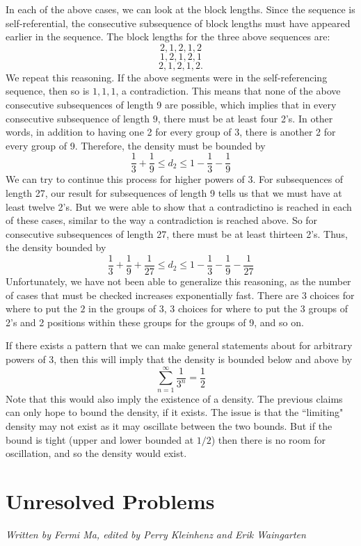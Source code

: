 \documentclass[runningheads,a4paper]{llncs}
\begin{document}
In each of the above cases, we can look at the block lengths. Since the sequence is self-referential, the consecutive subsequence of block lengths must have appeared earlier in the sequence. The block lengths for the three above sequences are:
\[ 2, 1, 2, 1, 2 \]
\[ 1, 2, 1, 2, 1\]
\[ 2, 1, 2, 1, 2 .\] 
We repeat this reasoning. If the above segments were in the self-referencing sequence, then so is $1, 1, 1$, a contradiction. This means that none of the above consecutive subsequences of length 9 are possible, which implies that in every consecutive subsequence of length $9$, there must be at least four 2's. In other words, in addition to having one 2 for every group of 3, there is another 2 for every group of 9. Therefore, the density must be bounded by
\[ \dfrac{1}{3} + \dfrac{1}{9} \leq d_2 \leq 1 - \dfrac{1}{3} - \dfrac{1}{9} \]
We can try to continue this process for higher powers of $3$. For subsequences of length 27, our result for subsequences of length 9 tells us that we must have at least twelve 2's. But we were able to show that a contradictino is reached in each of these cases, similar to the way a contradiction is reached above. So for consecutive subsequences of length 27, there must be at least thirteen 2's. Thus, the density bounded by
\[ \dfrac{1}{3} + \dfrac{1}{9} + \dfrac{1}{27} \leq d_2 \leq 1 - \dfrac{1}{3} - \dfrac{1}{9} - \dfrac{1}{27} \]
Unfortunately, we have not been able to generalize this reasoning, as the number of cases that must be checked increases exponentially fast. There are $3$ choices for where to put the $2$ in the groups of $3$, $3$ choices for where to put the 3 groups of 2's and 2 positions within these groups for the groups of 9, and so on.

If there exists a pattern that we can make general statements about for arbitrary powers of 3, then this will imply that the density is bounded below and above by
\[ \sum_{n=1}^\infty \dfrac{1}{3^n} = \frac{1}{2} \]
Note that this would also imply the existence of a density. The previous claims can only hope to bound the density, if it exists. The issue is that the ``limiting" density may not exist as it may oscillate between the two bounds. But if the bound is tight (upper and lower bounded at $1/2$) then there is no room for oscillation, and so the density would exist.

\section{Unresolved Problems}
\emph{Written by Fermi Ma, edited by Perry Kleinhenz and Erik Waingarten}
\end{document}
